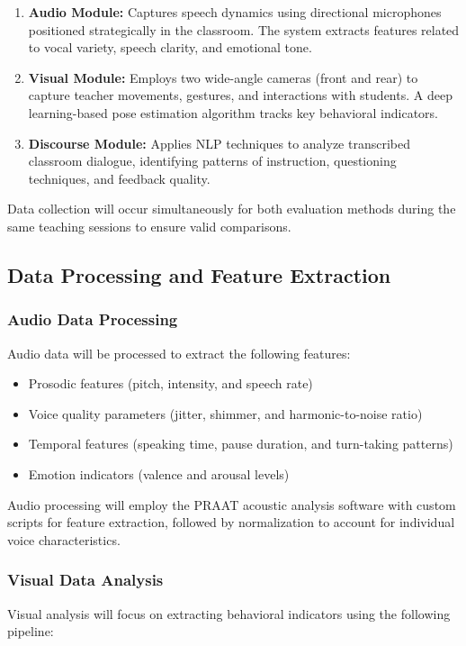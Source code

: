\begin{enumerate}
    \item \textbf{Audio Module:} Captures speech dynamics using directional microphones positioned strategically in the classroom. The system extracts features related to vocal variety, speech clarity, and emotional tone.
    
    \item \textbf{Visual Module:} Employs two wide-angle cameras (front and rear) to capture teacher movements, gestures, and interactions with students. A deep learning-based pose estimation algorithm tracks key behavioral indicators.
    
    \item \textbf{Discourse Module:} Applies NLP techniques to analyze transcribed classroom dialogue, identifying patterns of instruction, questioning techniques, and feedback quality.
\end{enumerate}

Data collection will occur simultaneously for both evaluation methods during the same teaching sessions to ensure valid comparisons.

\subsection{Data Processing and Feature Extraction}

\subsubsection{Audio Data Processing}
Audio data will be processed to extract the following features:
\begin{itemize}
    \item Prosodic features (pitch, intensity, and speech rate)
    \item Voice quality parameters (jitter, shimmer, and harmonic-to-noise ratio)
    \item Temporal features (speaking time, pause duration, and turn-taking patterns)
    \item Emotion indicators (valence and arousal levels)
\end{itemize}

Audio processing will employ the PRAAT acoustic analysis software with custom scripts for feature extraction, followed by normalization to account for individual voice characteristics.

\subsubsection{Visual Data Analysis}
Visual analysis will focus on extracting behavioral indicators using the following pipeline:

